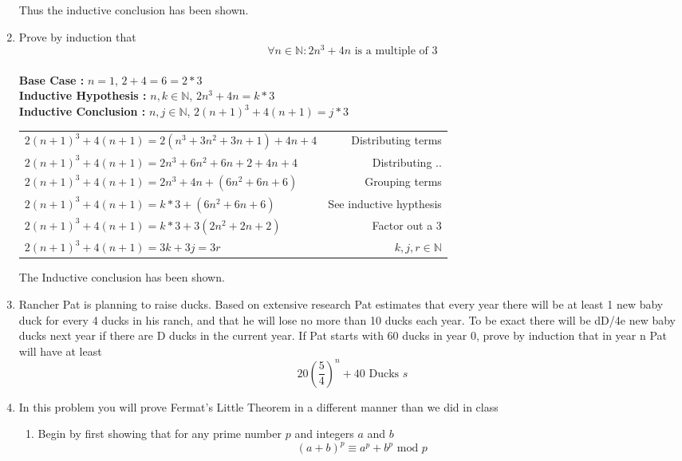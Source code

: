 \documentclass[a4paper,11pt]{article}
\begin{document}
\begin{enumerate}
Thus the inductive conclusion has been shown.



\item Prove by induction that
$$ \forall n \in \mathbb{N} : 2n^3+4n \text{ is a multiple of }3$$ \\
\textbf{ Base Case : } $n = 1$,  $ 2+4 = 6 = 2*3$ \\[.1in]
\textbf{ Inductive Hypothesis : } $n, k \in \mathbb{N}$,  $ 2n^3+4n = k*3$ \\[.1in]
\textbf{ Inductive Conclusion : } $n, j \in \mathbb{N}$,  $ 2(n+1)^3+4(n+1) = j*3$ \\[.1in]
\begin{tabular}{l | r}
$ 2(n+1)^3+4(n+1) = 2(n^3 + 3n^2 + 3n + 1) + 4n + 4$    & Distributing terms \\
$ 2(n+1)^3+4(n+1) = 2n^3 + 6n^2 + 6n + 2 + 4n + 4$      & Distributing ..  \\
$ 2(n+1)^3+4(n+1) = 2n^3 + 4n + (6n^2 + 6n + 6)$        & Grouping terms   \\
$ 2(n+1)^3+4(n+1) = k*3 + (6n^2 + 6n + 6)$              & See inductive hypthesis   \\
$ 2(n+1)^3+4(n+1) = k*3 + 3(2n^2 + 2n + 2)$             & Factor out a 3 \\
$ 2(n+1)^3+4(n+1) = 3k + 3j = 3r$                       & $k, j, r \in \mathbb{N}$   \\
\end{tabular}

The Inductive conclusion has been shown.

\item Rancher Pat is planning to raise ducks. Based on extensive research Pat estimates
that every year there will be at least 1 new baby duck for every 4 ducks in his ranch, and
that he will lose no more than 10 ducks each year. To be exact there will be dD/4e new baby
ducks next year if there are D ducks in the current year. If Pat starts with 60 ducks in year
0, prove by induction that in year n Pat will have at least
$$ 20(\frac{5}{4})^n + 40 \text{ Ducks }s $$

\item In this problem you will prove Fermat’s Little Theorem in a different manner than we did in
class

\begin{enumerate}
\item Begin by first showing that for any prime number $p$ and integers $a$ and $b$
$$ (a+b)^p \equiv a^p + b^p \text{ mod } p$$
\end{enumerate}





\end{enumerate}
\end{document}
